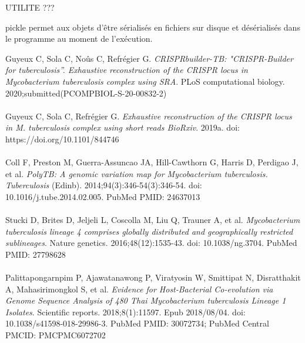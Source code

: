 \documentclass[twoside,a4paper,11pt,frenchb,openany]{report}
\begin{document}
	



UTILITE ???

pickle permet aux objets d'être sérialisés en fichiers sur disque et désérialisés dans le programme au moment de l'exécution.
	


\printindex



\begin{spacing}{0.5}

\renewcommand{\bibname}{Références}
\begin{thebibliography}{10}

Guyeux C, Sola C, Noûs C, Refrégier G. \textit{CRISPRbuilder-TB:
"CRISPR-Builder for tuberculosis''. Exhaustive reconstruction of the
CRISPR locus in Mycobacterium tuberculosis complex using SRA}. PLoS
computational biology. 2020;submitted(PCOMPBIOL-S-20-00832-2)\\ \\

Guyeux C, Sola C, Refrégier G. \textit{Exhaustive reconstruction of the
CRISPR locus in M. tuberculosis complex using short reads BioRxiv}.
2019a. doi: https://doi.org/10.1101/844746\\ \\

 Coll F, Preston M, Guerra-Assuncao JA, Hill-Cawthorn G, Harris D,
Perdigao J, et al. \textit{PolyTB: A genomic variation map for Mycobacterium
tuberculosis. Tuberculosis} (Edinb). 2014;94(3):346-54(3):346-54. doi:
10.1016/j.tube.2014.02.005. PubMed PMID: 24637013\\ \\

Stucki D, Brites D, Jeljeli L, Coscolla M, Liu Q, Trauner A, et al.
\textit{Mycobacterium tuberculosis lineage 4 comprises globally distributed and
geographically restricted sublineages}. Nature genetics.
2016;48(12):1535-43. doi: 10.1038/ng.3704. PubMed PMID: 27798628\\ \\

Palittapongarnpim P, Ajawatanawong P, Viratyosin W, Smittipat N,
Disratthakit A, Mahasirimongkol S, et al. \textit{Evidence for Host-Bacterial
Co-evolution via Genome Sequence Analysis of 480 Thai Mycobacterium
tuberculosis Lineage 1 Isolates}. Scientific reports. 2018;8(1):11597.
Epub 2018/08/04. doi: 10.1038/s41598-018-29986-3. PubMed PMID: 30072734;
PubMed Central PMCID: PMCPMC6072702\\ \\


\end{thebibliography}
\end{spacing}
\end{document}
